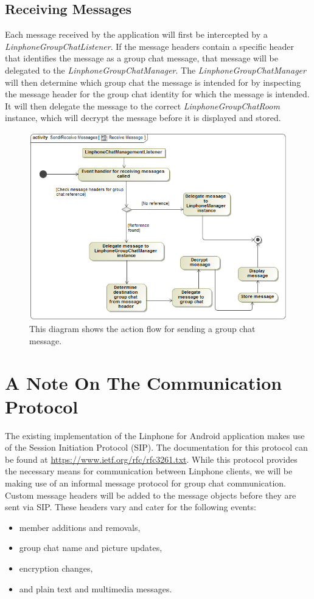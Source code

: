 \documentclass[11pt]{article}
\begin{document}
\subsection{Receiving Messages}
Each message received by the application will first be intercepted by a \textit{LinphoneGroupChatListener}. If the message headers contain a specific header that identifies the message as a group chat message, that message will be delegated to the \textit{LinphoneGroupChatManager}. The \textit{LinphoneGroupChatManager} will then determine which group chat the message is intended for by inspecting the message header for the group chat identity for which the message is intended. It will then delegate the message to the correct \textit{LinphoneGroupChatRoom} instance, which will decrypt the message before it is displayed and stored.
\begin{figure}[H]
\centering
\includegraphics[width=5in]{./images/activity_receive_message.png}
\caption[Receive Message Activity Diagram]{This diagram shows the action flow for sending a group chat message.}
\label{ad-receive-message}
\end{figure}

\section{A Note On The Communication Protocol}
The existing implementation of the Linphone for Android application makes use of the Session Initiation Protocol (SIP). The documentation for this protocol can be found at \href{https://www.ietf.org/rfc/rfc3261.txt}{https://www.ietf.org/rfc/rfc3261.txt}. While this protocol provides the necessary means for communication between Linphone clients, we will be making use of an informal message protocol for group chat communication. Custom message headers will be added to the message objects before they are sent via SIP. These headers vary and cater for the following events:
\begin{itemize}
\item member additions and removals,
\item group chat name and picture updates,
\item encryption changes,
\item and plain text and multimedia messages.
\end{itemize}
\end{document}
